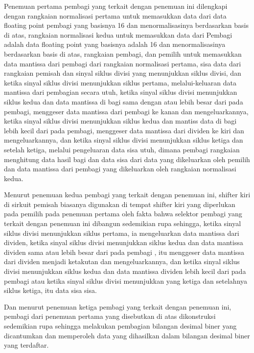 Penemuan pertama pembagi yang terkait dengan penemuan ini dilengkapi dengan rangkaian normalisasi pertama untuk memasukkan data dari data floating point pembagi yang basisnya 16 dan menormalisasinya berdasarkan basis di atas, 
rangkaian normalisasi kedua untuk memasukkan data dari Pembagi adalah data floating point yang basisnya adalah 16 dan menormalisasinya berdasarkan basis di atas, rangkaian pembagi, 
dan pemilih untuk memasukkan data mantissa dari pembagi dari rangkaian normalisasi pertama, 
sisa data dari rangkaian pemisah dan sinyal siklus divisi yang menunjukkan siklus divisi, dan ketika sinyal siklus divisi menunjukkan siklus pertama,
melalui-keluaran data mantissa dari pembagian secara utuh, ketika sinyal siklus divisi menunjukkan siklus kedua dan data mantissa di bagi sama dengan atau lebih besar dari pada pembagi, 
menggeser data mantissa dari pembagi ke kanan dan mengeluarkannya, 
ketika sinyal siklus divisi menunjukkan siklus kedua dan mantiss data di bagi lebih kecil dari pada pembagi, 
menggeser data mantissa dari dividen ke kiri dan mengeluarkannya,
dan ketika sinyal siklus divisi menunjukkan siklus ketiga dan setelah ketiga, melalui pengeluaran data sisa utuh, 
dimana pembagi rangkaian menghitung data hasil bagi dan data sisa dari data yang dikeluarkan oleh pemilih dan data mantissa dari pembagi yang dikeluarkan oleh rangkaian normalisasi kedua.

Menurut penemuan kedua pembagi yang terkait dengan penemuan ini, shifter kiri di sirkuit pemisah biasanya digunakan di tempat shifter kiri yang diperlukan pada pemilih pada penemuan pertama oleh fakta bahwa selektor pembagi yang terkait dengan penemuan ini dibangun sedemikian rupa sehingga, 
ketika sinyal siklus divisi menunjukkan siklus pertama, ia mengeluarkan data mantissa dari dividen, ketika sinyal siklus divisi menunjukkan siklus kedua dan data mantissa dividen sama atau lebih besar dari pada pembagi , 
itu menggeser data mantissa dari dividen menjadi ketakutan dan mengeluarkannya, dan ketika sinyal siklus divisi menunjukkan siklus kedua dan data mantissa dividen lebih kecil dari pada pembagi atau ketika sinyal siklus divisi menunjukkan yang ketiga dan setelahnya siklus ketiga, itu data sisa sisa.

Dan menurut penemuan ketiga pembagi yang terkait dengan penemuan ini, pembagi dari penemuan pertama yang disebutkan di atas dikonstruksi sedemikian rupa sehingga melakukan pembagian bilangan desimal biner yang dicantumkan dan memperoleh data yang dihasilkan dalam bilangan desimal biner yang terdaftar.

